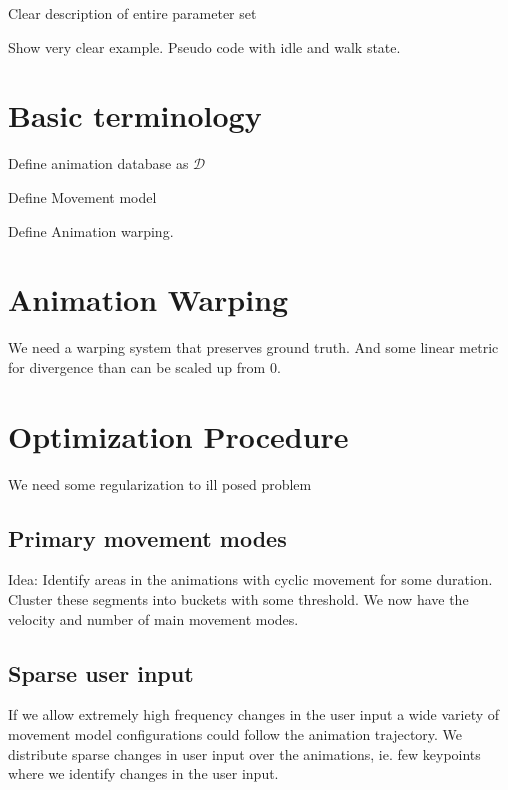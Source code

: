 Clear description of entire parameter set

Show very clear example. Pseudo code with idle and walk state. 



\section{Basic terminology}
Define animation database as $\mathcal{D}$

Define Movement model

Define Animation warping.


\section{Animation Warping}
We need a warping system that preserves ground truth. And some linear metric for divergence than can be scaled up from 0.


\section{Optimization Procedure}
We need some regularization to ill posed problem
\subsection{Primary movement modes}
Idea: Identify areas in the animations with cyclic movement for some duration. Cluster these segments into buckets with some threshold. We now have the velocity and number of main movement modes.
\subsection{Sparse user input}
If we allow extremely high frequency changes in the user input a wide variety of movement model configurations could follow the animation trajectory. We distribute sparse changes in user input over the animations, ie. few keypoints where we identify changes in the user input.


